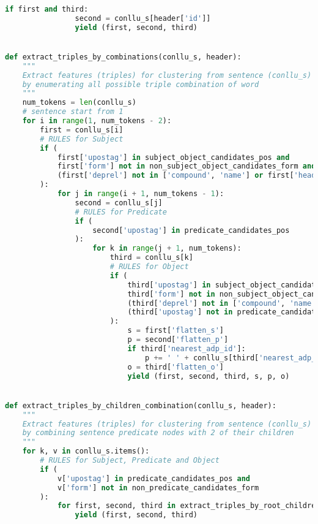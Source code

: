 \begin{lstlisting}[language=Python]
            if first and third:
                second = conllu_s[header['id']]
                yield (first, second, third)


def extract_triples_by_combinations(conllu_s, header):
    """
    Extract features (triples) for clustering from sentence (conllu_s)
    by enumerating all possible triple combination of word
    """
    num_tokens = len(conllu_s)
    # sentence start from 1
    for i in range(1, num_tokens - 2):
        first = conllu_s[i]
        # RULES for Subject
        if (
            first['upostag'] in subject_object_candidates_pos and
            first['form'] not in non_subject_object_candidates_form and
            (first['deprel'] not in ['compound', 'name'] or first['head_distance'] > 2)
        ):
            for j in range(i + 1, num_tokens - 1):
                second = conllu_s[j]
                # RULES for Predicate
                if (
                    second['upostag'] in predicate_candidates_pos
                ):
                    for k in range(j + 1, num_tokens):
                        third = conllu_s[k]
                        # RULES for Object
                        if (
                            third['upostag'] in subject_object_candidates_pos and
                            third['form'] not in non_subject_object_candidates_form and
                            (third['deprel'] not in ['compound', 'name'] or third['head_distance'] > 2) and
                            (third['upostag'] not in predicate_candidates_pos or first['upostag'] not in predicate_candidates_pos)
                        ):
                            s = first['flatten_s']
                            p = second['flatten_p']
                            if third['nearest_adp_id']:
                                p += ' ' + conllu_s[third['nearest_adp_id']]['form']
                            o = third['flatten_o']
                            yield (first, second, third, s, p, o)


def extract_triples_by_children_combination(conllu_s, header):
    """
    Extract features (triples) for clustering from sentence (conllu_s)
    by combining sentence predicate nodes with 2 of their children
    """
    for k, v in conllu_s.items():
        # RULES for Subject, Predicate and Object
        if (
            v['upostag'] in predicate_candidates_pos and
            v['form'] not in non_predicate_candidates_form
        ):
            for first, second, third in extract_triples_by_root_children(conllu_s, v):
                yield (first, second, third)



\end{lstlisting}
